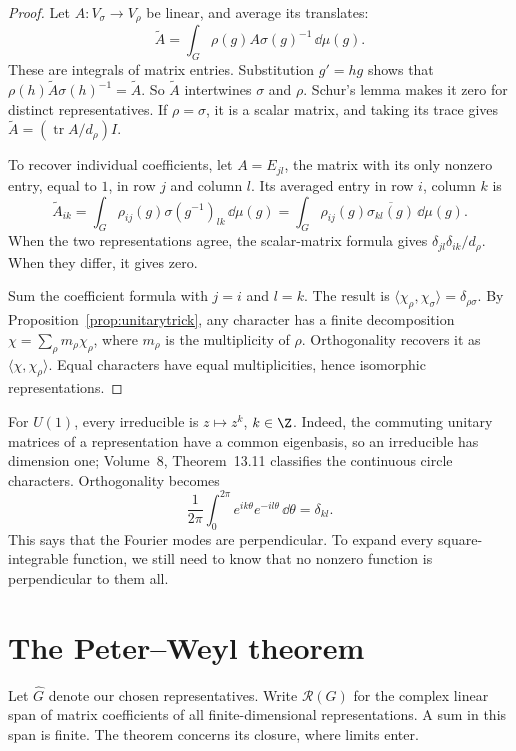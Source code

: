 \begin{proof}
Let $A\colon V_\sigma\to V_\rho$ be linear, and average its translates:
\[
\widetilde A=\int_G\rho(g)A\sigma(g)^{-1}\,\dd\mu(g).
\]
These are integrals of matrix entries. Substitution $g'=hg$ shows that
$\rho(h)\widetilde A\sigma(h)^{-1}=\widetilde A$.
So $\widetilde A$ intertwines $\sigma$ and $\rho$. Schur's lemma makes it zero for distinct representatives. If $\rho=\sigma$, it is a scalar matrix, and taking its trace gives
$\widetilde A=(\operatorname{tr}A/d_\rho)I$.

To recover individual coefficients, let $A=E_{jl}$, the matrix with its only nonzero entry, equal to $1$, in row $j$ and column $l$. Its averaged entry in row $i$, column $k$ is
\[
\widetilde A_{ik}
=\int_G\rho_{ij}(g)\sigma(g^{-1})_{lk}\,\dd\mu(g)
=\int_G\rho_{ij}(g)\overline{\sigma_{kl}(g)}\,\dd\mu(g).
\]
When the two representations agree, the scalar-matrix formula gives $\delta_{jl}\delta_{ik}/d_\rho$. When they differ, it gives zero.

Sum the coefficient formula with $j=i$ and $l=k$. The result is
$\langle\chi_\rho,\chi_\sigma\rangle=\delta_{\rho\sigma}$.
By Proposition~\ref{prop:unitarytrick}, any character has a finite decomposition
$\chi=\sum_\rho m_\rho\chi_\rho$, where $m_\rho$ is the multiplicity of $\rho$. Orthogonality recovers it as $\langle\chi,\chi_\rho\rangle$. Equal characters have equal multiplicities, hence isomorphic representations.
\end{proof}

For $U(1)$, every irreducible is $z\mapsto z^k$, $k\in\Z$. Indeed, the commuting unitary matrices of a representation have a common eigenbasis, so an irreducible has dimension one; Volume~8, Theorem~13.11 classifies the continuous circle characters. Orthogonality becomes
\[
\frac1{2\pi}\int_0^{2\pi}e^{ik\theta}e^{-il\theta}\,\dd\theta=\delta_{kl}.
\]
This says that the Fourier modes are perpendicular. To expand every square-integrable function, we still need to know that no nonzero function is perpendicular to them all.

\section{The Peter--Weyl theorem}

Let $\widehat G$ denote our chosen representatives. Write $\mathcal R(G)$ for the complex linear span of matrix coefficients of all finite-dimensional representations. A sum in this span is finite. The theorem concerns its closure, where limits enter.

